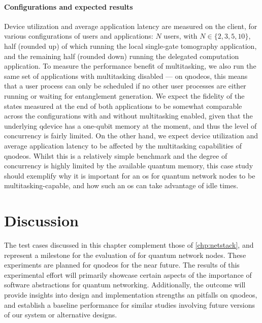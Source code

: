 \paragraph{Configurations and expected results}

Device utilization and average application latency are measured on the client, for various
configurations of users and applications: $N$ users, with $N \in \{2, 3, 5, 10\}$, half (rounded up)
of which running the local single-gate tomography application, and the remaining half (rounded down)
running the delegated computation application. To measure the performance benefit of multitasking,
we also run the same set of applications with multitasking disabled --- on \acrshort{qnodeos}, this
means that a user process can only be scheduled if no other user processes are either running or
waiting for entanglement generation. We expect the fidelity of the states measured at the end of
both applications to be somewhat comparable across the configurations with and without multitasking
enabled, given that the underlying \acrshort{qdevice} has a one-qubit memory at the moment, and thus
the level of concurrency is fairly limited. On the other hand, we expect device utilization and
average application latency to be affected by the multitasking capabilities of \acrshort{qnodeos}.
Whilst this is a relatively simple benchmark and the degree of concurrency is highly limited by the
available quantum memory, this case study should exemplify why it is important for an \acrshort{os}
for quantum network nodes to be multitasking-capable, and how such an \acrshort{os} can take
advantage of idle times.


\section{Discussion}

The test cases discussed in this chapter complement those of \cref{chp:netstack}, and represent a
milestone for the evaluation of  for quantum network nodes. These experiments are
planned for \acrshort{qnodeos} for the near future. The results of this experimental effort will
primarily showcase certain aspects of the importance of software abstractions for quantum
networking. Additionally, the outcome will provide insights into design and implementation strengths
an pitfalls on \acrshort{qnodeos}, and establish a baseline performance for similar studies
involving future versions of our system or alternative designs.

